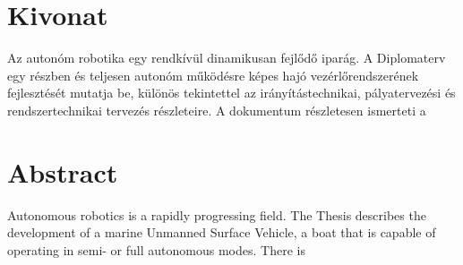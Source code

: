 \section{Kivonat}

Az autonóm robotika egy rendkívül dinamikusan fejlődő iparág.
A Diplomaterv egy részben és teljesen autonóm működésre képes hajó vezérlőrendszerének fejlesztését mutatja be, különös tekintettel az irányítástechnikai, pályatervezési és rendszertechnikai tervezés részleteire. A dokumentum részletesen ismerteti a 
\vfill

\section{Abstract}

Autonomous robotics is a rapidly progressing field. The Thesis describes the development of a marine Unmanned Surface Vehicle, a boat that is capable of operating in semi- or full autonomous modes. There is 
\vfill

